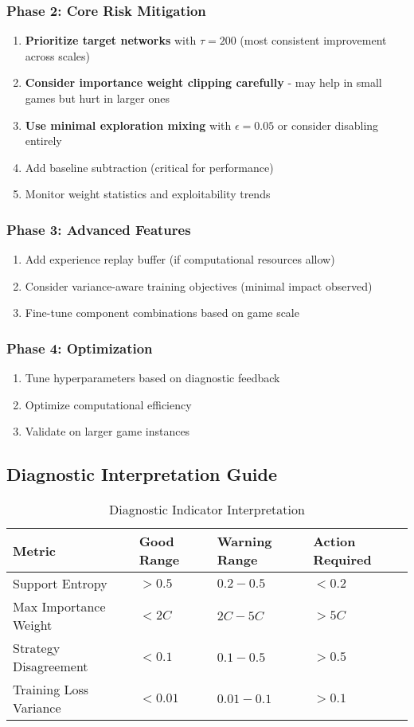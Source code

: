 \documentclass[12pt,a4paper]{article}
\begin{document}
\subsubsection{Phase 2: Core Risk Mitigation}
\begin{enumerate}
\item \textbf{Prioritize target networks} with $\tau = 200$ (most consistent improvement across scales)
\item \textbf{Consider importance weight clipping carefully} - may help in small games but hurt in larger ones
\item \textbf{Use minimal exploration mixing} with $\epsilon = 0.05$ or consider disabling entirely
\item Add baseline subtraction (critical for performance)
\item Monitor weight statistics and exploitability trends
\end{enumerate}

\subsubsection{Phase 3: Advanced Features}
\begin{enumerate}
\item Add experience replay buffer (if computational resources allow)
\item Consider variance-aware training objectives (minimal impact observed)
\item Fine-tune component combinations based on game scale
\end{enumerate}

\subsubsection{Phase 4: Optimization}
\begin{enumerate}
\item Tune hyperparameters based on diagnostic feedback
\item Optimize computational efficiency
\item Validate on larger game instances
\end{enumerate}

\subsection{Diagnostic Interpretation Guide}

\begin{table}[H]
\centering
\caption{Diagnostic Indicator Interpretation}
\begin{tabular}{@{}llll@{}}
\toprule
Metric & Good Range & Warning Range & Action Required \\
\midrule
Support Entropy & $> 0.5$ & $0.2 - 0.5$ & $< 0.2$ \\
Max Importance Weight & $< 2C$ & $2C - 5C$ & $> 5C$ \\
Strategy Disagreement & $< 0.1$ & $0.1 - 0.5$ & $> 0.5$ \\
Training Loss Variance & $< 0.01$ & $0.01 - 0.1$ & $> 0.1$ \\
\bottomrule
\end{tabular}
\end{table}
\end{document}
